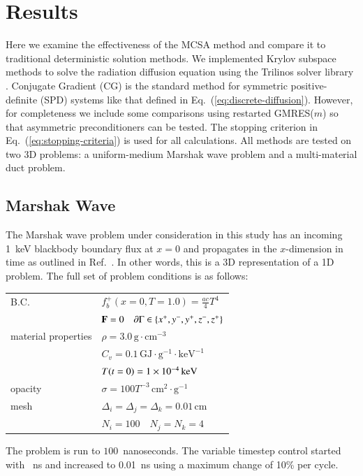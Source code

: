 \documentclass[preprint,12pt]{elsarticle}
\newcommand{\Cv}{\ensuremath{C_{v}}}
\newcommand{\Di}{\ensuremath{\Delta_i}}
\newcommand{\Dj}{\ensuremath{\Delta_j}}
\newcommand{\Dk}{\ensuremath{\Delta_k}}
\begin{document}
\section{Results}
\label{sec:results}

Here we examine the effectiveness of the MCSA method and compare it to
traditional deterministic solution methods.  We implemented Krylov subspace
methods to solve the radiation diffusion equation using the Trilinos solver
library \cite{1089021}.  Conjugate Gradient (CG) is the standard method for
symmetric positive-definite (SPD) systems like that defined in
Eq.~(\ref{eq:discrete-diffusion}).  However, for completeness we include some
comparisons using restarted GMRES($m$) so that asymmetric preconditioners can
be tested. The stopping criterion in Eq.~(\ref{eq:stopping-criteria}) is used
for all calculations. All methods are tested on two 3D problems: a
uniform-medium Marshak wave problem and a multi-material duct problem.

\subsection{Marshak Wave}

The Marshak wave problem under consideration in this study has an incoming
1~keV blackbody boundary flux at $x=0$ and propagates in the $x$-dimension in
time as outlined in Ref.~\cite{larsen_1980}.  In other words, this is a 3D
representation of a 1D problem.  The full set of problem conditions is as
follows:
\begin{center}
  \begin{tabular}{ll}\hline
    B.C. & $f_b^{+}(x=0,T=1.0) = \frac{ac}{4}T^4$ \\ & $\mathbf{F} =
    0\quad \partial\Gamma \in \{x^{+}, y^{-}, y^{+}, z^{-}, z^{+}\}$
    \\ material properties & $\rho =
    3.0\,\text{g}\cdot\text{cm}^{-3}$ \\ & $\Cv =
    0.1\,\text{GJ}\cdot\text{g}^{-1}\cdot\text{keV}^{-1}$\\ &
    $T(t=0) = 1\times 10^{-4}\,\text{keV}$\\  opacity & $\sigma =
    100T^{-3}\,\text{cm}^2\cdot\text{g}^{-1}$ \\  mesh & $\Di = \Dj
    = \Dk = 0.01\,\text{cm}$ \\ & $N_i = 100\quad N_j = N_k = 4$
    \\ \hline
  \end{tabular}
\end{center}
The problem is run to $100$~nanoseconds.  The variable timestep control
started with ~ns and increased to 0.01~ns using a maximum change
of 10\% per cycle.
\end{document}
